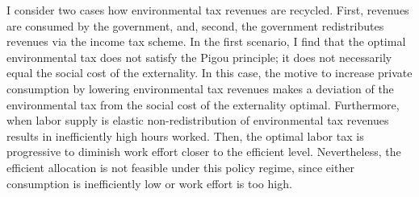 I consider two cases how environmental tax revenues are recycled. First, revenues are consumed by the government, and, second, the government redistributes revenues via the income tax scheme. In the first scenario, I find that the optimal environmental tax does not satisfy the Pigou principle; it does not necessarily equal the social cost of the externality. %
In this case, the motive to increase private consumption by lowering environmental tax revenues makes a deviation of the environmental tax from the social cost of the externality optimal.
Furthermore, when labor supply is elastic non-redistribution of environmental tax revenues results in inefficiently high hours worked. Then, the optimal labor tax is progressive to diminish work effort closer to the efficient level.
Nevertheless, the efficient allocation is not feasible under this policy regime, since either consumption is inefficiently low or work effort is too high. 

